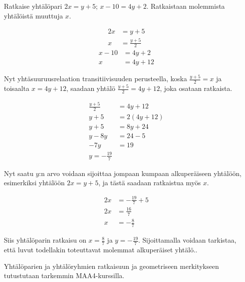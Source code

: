 \begin{esimerkki}
Ratkaise yhtälöpari $2x=y+5$; $x-10=4y+2$. Ratkaistaan molemmista yhtälöistä muuttuja $x$. 
	
	\begin{align*}
	    2x &= y+5 \\
	    x &= \frac{y+5}{2}
	\end{align*}
	\begin{align*}
	    x-10 &= 4y+2 \\
	    x &= 4y+12
	\end{align*}
	
Nyt yhtäsuuruusrelaation transitiivisuuden perusteella, koska $\frac{y+5}{2}=x$ ja toisaalta $x=4y+12$, saadaan yhtälö $\frac{y+5}{2}=4y+12$, joka osataan ratkaista.

\begin{align*}
	\frac{y+5}{2} &= 4y+12 \\
	y+5 &= 2(4y+12)\\
	y+5 &= 8y+24 \\
	y -8y&= 24-5 \\
	-7y &= 19 \\
	y=-\frac{19}{7}
\end{align*}

Nyt saatu $y$:n arvo voidaan sijoittaa jompaan kumpaan alkuperäiseen yhtälöön, esimerkiksi yhtälöön $2x=y+5$, ja tästä saadaan ratkaistua myös $x$.

\begin{align*}
      2x &= -\frac{19}{7}+5\\
      2x &= \frac{16}{7} \\
      x &= -\frac{8}{7}
\end{align*}

Siis yhtälöparin ratkaisu on $x=\frac{8}{7}$ ja $y=-\frac{19}{7}$. Sijoittamalla voidaan tarkistaa, että luvut todellakin toteuttavat molemmat alkuperäiset yhtälö..
\end{esimerkki} %

Yhtälöparien ja yhtälöryhmien ratkaisuun ja geometriseen merkitykseen tutustutaan tarkemmin MAA4-kurssilla.
